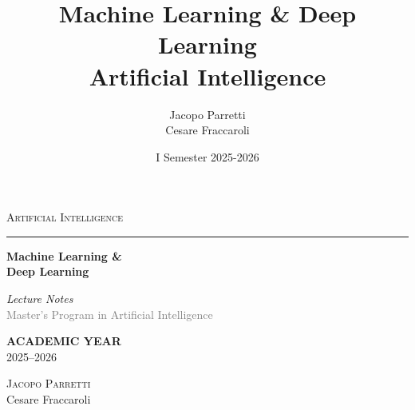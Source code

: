 \documentclass[11pt,a4paper]{article}
\title{\textbf{Machine Learning \& Deep Learning}\\
\large Artificial Intelligence}
\author{Jacopo Parretti \\ Cesare Fraccaroli}
\date{I Semester 2025-2026}
\theoremstyle{definition}
\theoremstyle{plain}
\theoremstyle{remark}
\begin{document}
\begin{titlepage}
    \begin{center}
        \vspace*{2cm}
        
        {\large\textsc{Artificial Intelligence}}
        
        \vspace{0.4cm}
        \textcolor{blue!60!black}{\rule{0.5\textwidth}{1pt}}
        
        \vspace{2.5cm}
        
        {\fontsize{36}{44}\selectfont\bfseries Machine Learning \&\\[0.5cm] Deep Learning}
        
        \vspace{1.5cm}
        
        \begin{tcolorbox}[
            colback=blue!3!white,
            colframe=blue!40!black,
            width=0.6\textwidth,
            arc=1mm,
            boxrule=0.8pt,
            left=15pt,
            right=15pt,
            top=10pt,
            bottom=10pt
        ]
            \centering
            {\large\textit{Lecture Notes}}\\[0.3cm]
            \textcolor{gray}{Master's Program in Artificial Intelligence}
        \end{tcolorbox}
        
        \vfill
        
        \begin{tcolorbox}[
            enhanced,
            colback=white,
            colframe=gray!30,
            width=0.5\textwidth,
            arc=0mm,
            boxrule=0.5pt,
            left=20pt,
            right=20pt,
            top=12pt,
            bottom=12pt,
            shadow={2mm}{-2mm}{0mm}{black!10}
        ]
            \centering
            {\small\textcolor{gray!70}{\textbf{ACADEMIC YEAR}}}\\[0.4cm]
            {\Large 2025--2026}
        \end{tcolorbox}
        
        \vspace{2cm}
        
        {\LARGE\textsc{Jacopo Parretti}\\[0.3cm]Cesare Fraccaroli}
        
        \vspace{1.5cm}
        
    \end{center}
\end{titlepage}
\end{document}
